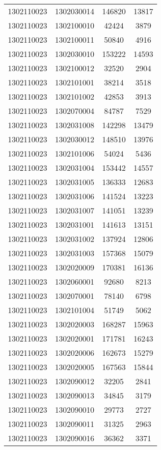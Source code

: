 \begin{longtable}[h]{llcc}
		1302110023 & 1302030014 & 146820 & 13817\\
		1302110023 & 1302100010 & 42424 & 3879\\
		1302110023 & 1302100011 & 50840 & 4916\\
		1302110023 & 1302030010 & 153222 & 14593\\
		1302110023 & 1302100012 & 32520 & 2904\\
		1302110023 & 1302101001 & 38214 & 3518\\
		1302110023 & 1302101002 & 42853 & 3913\\
		1302110023 & 1302070004 & 84787 & 7529\\
		1302110023 & 1302031008 & 142298 & 13479\\
		1302110023 & 1302030012 & 148510 & 13976\\
		1302110023 & 1302101006 & 54024 & 5436\\
		1302110023 & 1302031004 & 153442 & 14557\\
		1302110023 & 1302031005 & 136333 & 12683\\
		1302110023 & 1302031006 & 141524 & 13223\\
		1302110023 & 1302031007 & 141051 & 13239\\
		1302110023 & 1302031001 & 141613 & 13151\\
		1302110023 & 1302031002 & 137924 & 12806\\
		1302110023 & 1302031003 & 157368 & 15079\\
		1302110023 & 1302020009 & 170381 & 16136\\
		1302110023 & 1302060001 & 92680 & 8213\\
		1302110023 & 1302070001 & 78140 & 6798\\
		1302110023 & 1302101004 & 51749 & 5062\\
		1302110023 & 1302020003 & 168287 & 15963\\
		1302110023 & 1302020001 & 171781 & 16243\\
		1302110023 & 1302020006 & 162673 & 15279\\
		1302110023 & 1302020005 & 167563 & 15844\\
		1302110023 & 1302090012 & 32205 & 2841\\
		1302110023 & 1302090013 & 34845 & 3179\\
		1302110023 & 1302090010 & 29773 & 2727\\
		1302110023 & 1302090011 & 31325 & 2963\\
		1302110023 & 1302090016 & 36362 & 3371\\

\end{longtable}
